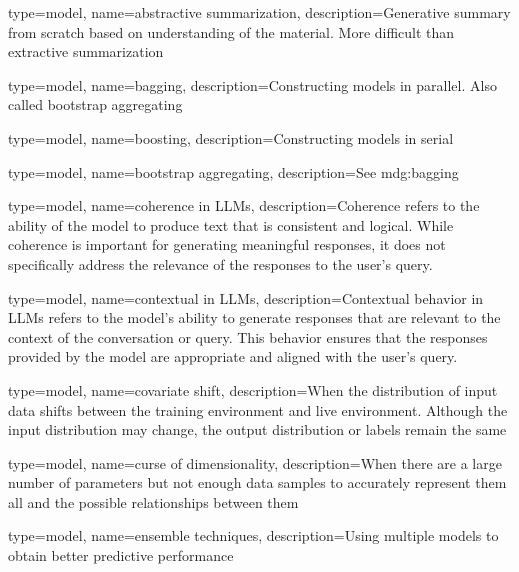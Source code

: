 

{
	type=model,
    name=abstractive summarization,
    description={Generative summary from scratch based on understanding of the material.  More difficult than extractive summarization}
}

{
	type=model,
    name=bagging,
    description={Constructing models in parallel.  Also called bootstrap aggregating}
}

{
	type=model,
    name=boosting,
    description={Constructing models in serial}
}

{
	type=model,
    name=bootstrap aggregating,
    description={See \gls{mdg:bagging}}
}

{
	type=model,
    name=coherence in LLMs,
    description={Coherence refers to the ability of the model to produce text that is consistent and logical. While coherence is important for generating meaningful responses, it does not specifically address the relevance of the responses to the user's query.}
}

{
	type=model,
    name=contextual in LLMs,
    description={Contextual behavior in LLMs refers to the model's ability to generate responses that are relevant to the context of the conversation or query. This behavior ensures that the responses provided by the model are appropriate and aligned with the user's query.}
}

{
	type=model,
    name=covariate shift,
    description={When the distribution of input data shifts between the training environment and live environment.  Although the input distribution may change, the output distribution or labels remain the same}
}

{
	type=model,
    name=curse of dimensionality,
    description={When there are a large number of parameters but not enough data samples to accurately represent them all and the possible relationships between them}
}

{
	type=model,
    name=ensemble techniques,
    description={Using multiple models to obtain better predictive performance}
}

